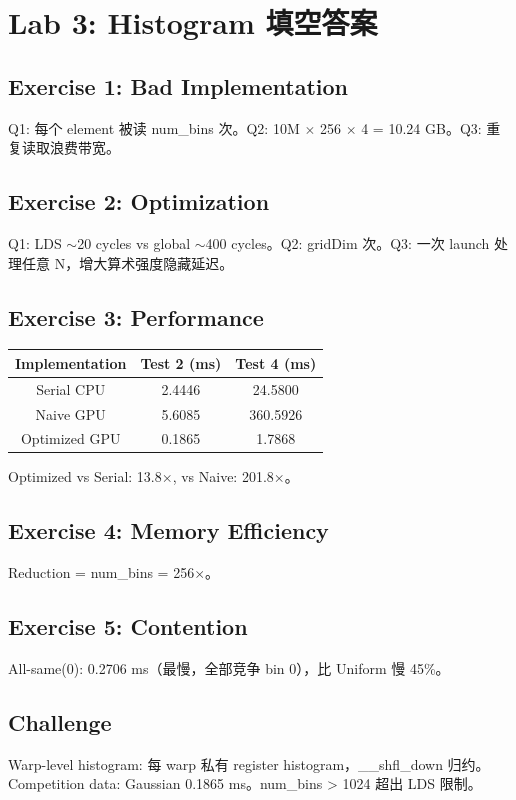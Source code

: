 \documentclass[a4paper]{article}
\begin{document}
\newpage
\section{Lab 3: Histogram 填空答案}

\subsection*{Exercise 1: Bad Implementation}
Q1: 每个 element 被读 num\_bins 次。Q2: 10M $\times$ 256 $\times$ 4 = 10.24 GB。Q3: 重复读取浪费带宽。

\subsection*{Exercise 2: Optimization}
Q1: LDS $\sim$20 cycles vs global $\sim$400 cycles。Q2: gridDim 次。Q3: 一次 launch 处理任意 N，增大算术强度隐藏延迟。

\subsection*{Exercise 3: Performance}
\begin{tabular}{|c|c|c|}
\hline
Implementation & Test 2 (ms) & Test 4 (ms) \\
\hline
Serial CPU & 2.4446 & 24.5800 \\
Naive GPU & 5.6085 & 360.5926 \\
Optimized GPU & 0.1865 & 1.7868 \\
\hline
\end{tabular}
Optimized vs Serial: 13.8$\times$, vs Naive: 201.8$\times$。

\subsection*{Exercise 4: Memory Efficiency}
Reduction = num\_bins = 256$\times$。

\subsection*{Exercise 5: Contention}
All-same(0): 0.2706 ms（最慢，全部竞争 bin 0），比 Uniform 慢 45\%。

\subsection*{Challenge}
Warp-level histogram: 每 warp 私有 register histogram，\_\_shfl\_down 归约。Competition data: Gaussian 0.1865 ms。num\_bins > 1024 超出 LDS 限制。
\end{document}
